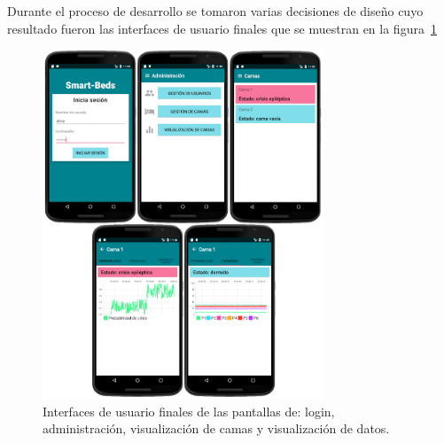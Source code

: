 Durante el proceso de desarrollo se tomaron varias decisiones de diseño cuyo resultado fueron las interfaces de usuario finales que se muestran en la figura~\ref{fig:interfaces}

\begin{figure}[H]
	\centering
	\includegraphics[width=0.75\textwidth]{../img/interfaces.png}
	\caption{Interfaces de usuario finales de las pantallas de: login, administración, visualización de camas y visualización de datos.}
	\label{fig:interfaces}
\end{figure}
